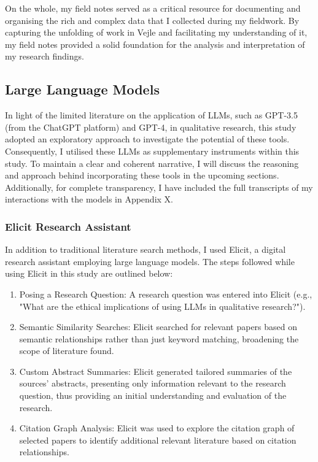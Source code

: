 \documentclass[
]{book}
\providecommand{\tightlist}{%
  \setlength{\itemsep}{0pt}\setlength{\parskip}{0pt}}
\begin{document}
On the whole, my field notes served as a critical resource for documenting and organising the rich and complex data that I collected during my fieldwork. By capturing the unfolding of work in Vejle and facilitating my understanding of it, my field notes provided a solid foundation for the analysis and interpretation of my research findings.

\hypertarget{large-language-models}{%
\subsection{Large Language Models}\label{large-language-models}}

In light of the limited literature on the application of LLMs, such as GPT-3.5 (from the ChatGPT platform) and GPT-4, in qualitative research, this study adopted an exploratory approach to investigate the potential of these tools. Consequently, I utilised these LLMs as supplementary instruments within this study. To maintain a clear and coherent narrative, I will discuss the reasoning and approach behind incorporating these tools in the upcoming sections. Additionally, for complete transparency, I have included the full transcripts of my interactions with the models in Appendix X.

\hypertarget{elicit-research-assistant}{%
\subsubsection{Elicit Research Assistant}\label{elicit-research-assistant}}

In addition to traditional literature search methods, I used Elicit, a digital research assistant employing large language models. The steps followed while using Elicit in this study are outlined below:

\begin{enumerate}
\def\labelenumi{\arabic{enumi}.}
\tightlist
\item
  Posing a Research Question: A research question was entered into Elicit (e.g., "What are the ethical implications of using LLMs in qualitative research?").
\item
  Semantic Similarity Searches: Elicit searched for relevant papers based on semantic relationships rather than just keyword matching, broadening the scope of literature found.
\item
  Custom Abstract Summaries: Elicit generated tailored summaries of the sources' abstracts, presenting only information relevant to the research question, thus providing an initial understanding and evaluation of the research.
\item
  Citation Graph Analysis: Elicit was used to explore the citation graph of selected papers to identify additional relevant literature based on citation relationships.
\end{enumerate}
\end{document}
